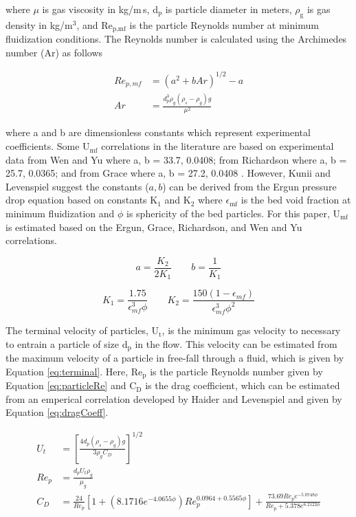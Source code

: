 \noindent where $\mu$ is gas viscosity in kg/m\,s, d$_\text{p}$ is particle diameter in meters, $\rho_\text{g}$ is gas density in kg/m$^3$, and Re$_\text{p,mf}$ is the particle Reynolds number at minimum fluidization conditions. The Reynolds number is calculated using the Archimedes number (Ar) as follows

\begin{align}
    Re_{p,mf} &= \left( a^2 + b Ar \right)^{1/2} - a \\
    Ar &= \frac{d_p^3 \rho_g (\rho_s - \rho_g) g}{\mu^2}
\end{align}

\noindent where a and b are dimensionless constants which represent experimental coefficients. Some U$_\text{mf}$ correlations in the literature are based on experimental data from Wen and Yu where a, b = 33.7, 0.0408; from Richardson where a, b = 25.7, 0.0365; and from Grace where a, b = 27.2, 0.0408 \cite{Levenspiel-1991}. However, Kunii and Levenspiel \cite{Levenspiel-1991} suggest the constants ($a, b$) can be derived from the Ergun pressure drop equation based on constants K$_1$ and K$_2$ where $\epsilon_\text{mf}$ is the bed void fraction at minimum fluidization and $\phi$ is sphericity of the bed particles. For this paper, U$_\text{mf}$ is estimated based on the Ergun, Grace, Richardson, and Wen and Yu correlations.

\begin{equation}
    a = \frac{K_2}{2 K_1} \qquad
    b = \frac{1}{K_1}
\end{equation}

\begin{equation}
    K_1 = \frac{1.75}{\epsilon_{mf}^3 \phi} \qquad
    K_2 = \frac{150(1-\epsilon_{mf})}{\epsilon_{mf}^3 \phi^2}
\end{equation}

The terminal velocity of particles, U$_\text{t}$, is the minimum gas velocity to necessary to entrain a particle of size d$_\text{p}$ in the flow. This velocity can be estimated from the maximum velocity of a particle in free-fall through a fluid, which is given by Equation \ref{eq:terminal}. Here, Re$_\text{p}$ is the particle Reynolds number given by Equation \ref{eq:particleRe} and C$_\text{D}$ is the drag coefficient, which can be estimated from an emperical correlation developed by Haider and Levenspiel \cite{haider1989drag} and given by Equation \ref{eq:dragCoeff}.

\begin{align}
    U_{t} &= \left [\frac{4d_{p} \left (\rho_{s}-\rho_{g} \right )g}{3\rho_{g}C_{D}}\right ]^{1/2} \label{eq:terminal} \\
    Re_{p} &= \frac{d_{p}U_{t}\rho_{g}}{\mu_{g}} \label{eq:particleRe} \\
    C_{D} &= \frac{24}{Re_{p}}\left [ 1+\left ( 8.1716e^{-4.0655\phi } \right )Re_{p}^{0.0964+0.5565\phi} \right ]+\frac{73.69Re_{p}e^{-5.0748\phi}}{Re_{p}+5.378e^{6.2122\phi}} \label{eq:dragCoeff}
\end{align}


